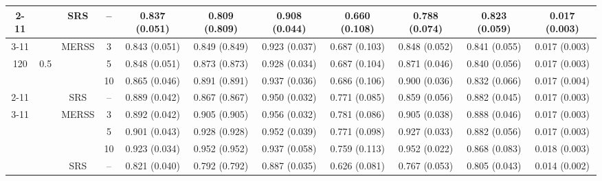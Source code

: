 \documentclass[twoside]{article}
\begin{document}
\begin{table}[!htb]
{\begin{tabular}{c c c c c c c c c c c}
    
 \cmidrule(lr){2-11}
  &\multirow{9}{*}{ }  & 
   \multirow{1}{*}{SRS} & -- 
 &0.837 (0.051) & 0.809 (0.809) & 0.908 (0.044) & 0.660 (0.108) & 0.788 (0.074) & 0.823 (0.059)& 0.017 (0.003)  \\
    
    \cmidrule(lr){3-11}
    &                      & \multirow{3}{*}{MERSS}   &  3   & 
    0.843 (0.051) & 0.849 (0.849) & 0.923 (0.037) & 0.687 (0.103) & 0.848 (0.052) & 0.841 (0.055)& 0.017 (0.003)  \\

 120 &          0.5            &                                          &  5    &
   0.848 (0.051) & 0.873 (0.873) & 0.928 (0.034) & 0.687 (0.104) & 0.871 (0.046) & 0.840 (0.056)& 0.017 (0.003)  \\

    &                      &                                          &  10   &
  0.865 (0.046) & 0.891 (0.891) & 0.937 (0.036) & 0.686 (0.106) & 0.900 (0.036) & 0.832 (0.066)& 0.017 (0.004)  \\
  

    \cmidrule(lr){2-11}
 &\multirow{9}{*}{ }  & 
    \multirow{1}{*}{SRS} & -- 
 &0.889 (0.042) & 0.867 (0.867) & 0.950 (0.032) & 0.771 (0.085) & 0.859 (0.056) & 0.882 (0.045)& 0.017 (0.003)  \\
    
    \cmidrule(lr){3-11}
    &                      & \multirow{3}{*}{MERSS}   &  3   & 
    0.892 (0.042) & 0.905 (0.905) & 0.956 (0.032) & 0.781 (0.086) & 0.905 (0.038) & 0.888 (0.046)& 0.017 (0.003)  \\

    &               0.7       &                                          &  5    &
    0.901 (0.043) & 0.928 (0.928) & 0.952 (0.039) & 0.771 (0.098) & 0.927 (0.033) & 0.882 (0.056)& 0.017 (0.003)  \\

    &                      &                                          &  10   &
   0.923 (0.034) & 0.952 (0.952) & 0.937 (0.058) & 0.759 (0.113) & 0.952 (0.022) & 0.868 (0.083)& 0.018 (0.003)  \\

    \bottomrule 
    \multirow{27}{*}{} & 
    \multirow{9}{*}{ }  & 
    \multirow{1}{*}{SRS} & -- 
 &0.821 (0.040) & 0.792 (0.792) & 0.887 (0.035) & 0.626 (0.081) & 0.767 (0.053) & 0.805 (0.043)& 0.014 (0.002)  \\
   

\end{tabular}}
\end{table}
\end{document}
